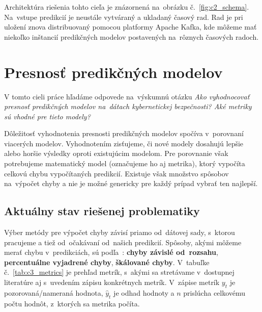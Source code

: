 \documentclass[thesismargins, thesislinespacing, openright, upjsfrontpage]{rnthesis}
\begin{document}
Architektúra riešenia tohto cieľa je znázornená na~obrázku č.~\ref{fig:c2_schema}. Na~vstupe predikcií je neustále vytváraný a ukladaný časový rad. Rad je pri uložení znova distribuovaný pomocou platformy Apache Kafka, kde môžeme mať niekoľko inštancií predikčných modelov postavených na~rôznych časových radoch.

\section{Presnosť predikčných modelov}
V tomto cieli práce hľadáme odpovede na~výskumnú otázku \textit{Ako vyhodnocovať presnosť predikčných modelov na~dátach kybernetickej bezpečnosti? Aké metriky sú vhodné pre tieto modely?}

Dôležitosť vyhodnotenia presnosti predikčných modelov spočíva v~porovnaní viacerých modelov. Vyhodnotením zisťujeme, či nové modely dosahujú lepšie alebo horšie výsledky oproti existujúcim modelom. Pre porovnanie však potrebujeme matematický model (označujeme ho aj metrika), ktorý vypočíta celkovú chybu vypočítaných pre\-dikcií. Existuje však množstvo spôsobov na~výpočet chyby a nie je možné genericky pre každý prípad vybrať ten najlepší. 

\subsection{Aktuálny stav riešenej problematiky}

Výber metódy pre výpočet chyby závisí priamo od~dátovej sady, s~ktorou pracujeme a tiež od~očakávaní od~našich predikcií. Spôsoby, akými môžeme merať chybu v~predikciách, sú podľa~\cite{hyndman2018forecasting}:  \textbf{chyby závislé od~rozsahu}, \textbf{percentuálne vyjadrené chyby},  \textbf{škálované chyby}. V~tabuľke č.~\ref{tab:c3_metrics} je prehľad metrík, s~akými sa stretávame v~dostupnej literatúre aj s~uvedením zápisu konkrétnych metrík. V~zápise metrík $y_t$ je pozorovaná/nameraná hodnota, $\hat{y}_{t}$ je odhad hodnoty a $n$ prislúcha celkovému počtu hodnôt, z~ktorých sa metrika počíta.
\end{document}
